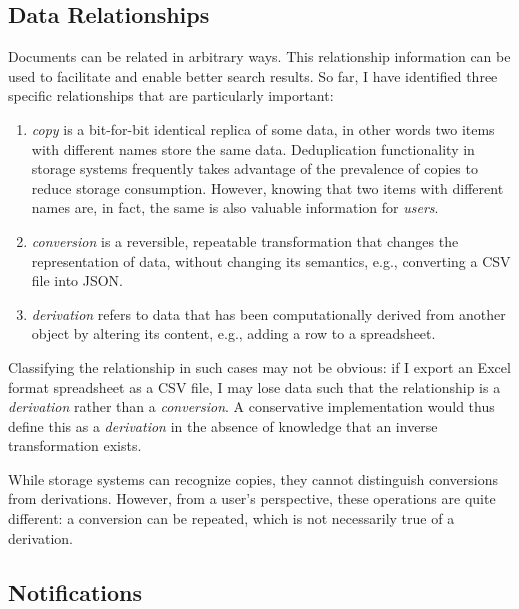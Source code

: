 \subsection{Data Relationships}

Documents can be related in arbitrary ways. This relationship information can be
used to facilitate and enable better search results. So far, I have identified
three specific relationships that are particularly important:

\begin{enumerate}
    \item \emph{copy} is a bit-for-bit identical replica of some data, in other
          words two items with different names store the same data. Deduplication
          functionality in storage systems frequently takes advantage of the
          prevalence of copies to reduce storage consumption. However, knowing that
          two items with different names are, in fact, the same is also valuable
          information for \emph{users}.

    \item \emph{conversion} is a reversible, repeatable transformation that
          changes the representation of data, without changing its semantics, e.g.,
          converting a CSV file into JSON.


    \item \emph{derivation} refers to data that has been computationally derived
          from another object by altering its content, e.g., adding a row to a
          spreadsheet.

\end{enumerate}

Classifying the relationship in such cases may not be obvious: if I
export an Excel format spreadsheet as a CSV file, I may lose data such that the
relationship is a \emph{derivation} rather than a \emph{conversion}.  A
conservative implementation would thus define this as a \emph{derivation} in the
absence of knowledge that an inverse transformation exists.

While storage systems can recognize copies, they cannot distinguish
conversions from derivations. However, from a user's perspective, these
operations are quite different: a conversion can be repeated, which is not
necessarily true of a derivation.

\subsection{Notifications}

